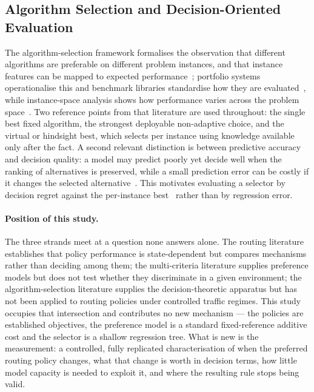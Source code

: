\documentclass[runningheads]{llncs}
\begin{document}
\subsection{Algorithm Selection and Decision-Oriented Evaluation}

The algorithm-selection framework formalises the observation that different algorithms are
preferable on different problem instances, and that instance features can be mapped to
expected performance~\cite{rice1976algorithm}; portfolio systems operationalise this and
benchmark libraries standardise how they are
evaluated~\cite{xu2008satzilla,bischl2016aslib,kotthoff2014survey}, while instance-space
analysis shows how performance varies across the problem space~\cite{smithmiles2023isa}.
Two reference points from that literature are used throughout: the single best fixed
algorithm, the strongest deployable non-adaptive choice, and the virtual or hindsight
best, which selects per instance using knowledge available only after the fact. A second
relevant distinction is between predictive accuracy and decision quality: a model may
predict poorly yet decide well when the ranking of alternatives is preserved, while a small
prediction error can be costly if it changes the selected
alternative~\cite{elmachtoub2022smart}. This motivates evaluating a selector by decision
regret against the per-instance best~\cite{kouvelis1997robust} rather than by regression
error.

\paragraph{Position of this study.}
The three strands meet at a question none answers alone. The routing literature
establishes that policy performance is state-dependent but compares mechanisms rather than
deciding among them; the multi-criteria literature supplies preference models but does not
test whether they discriminate in a given environment; the algorithm-selection literature
supplies the decision-theoretic apparatus but has not been applied to routing policies
under controlled traffic regimes. This study occupies that intersection and contributes no
new mechanism --- the policies are established objectives, the preference model is a
standard fixed-reference additive cost and the selector is a shallow regression tree. What
is new is the measurement: a controlled, fully replicated characterisation of when the
preferred routing policy changes, what that change is worth in decision terms, how little
model capacity is needed to exploit it, and where the resulting rule stops being valid.
\end{document}
